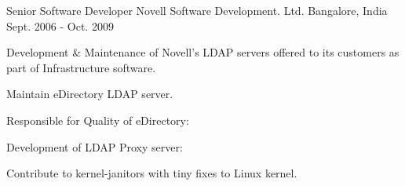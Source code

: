   \cventry
    {Senior Software Developer} %
    {Novell Software Development. Ltd.} %
    {Bangalore, India} %
    {Sept. 2006 - Oct. 2009} %
    {
      \begin{cvitems} %
      \item {Development \& Maintenance of Novell's LDAP servers offered to its customers as part of Infrastructure software.}
      \item {Maintain eDirectory LDAP server.}
      \item {Responsible for Quality of  eDirectory:}
      \item {Development of LDAP Proxy server:}
      \item {Contribute to kernel-janitors with tiny fixes to Linux kernel.}
      \end{cvitems}
    }
